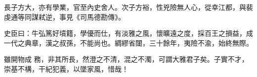 \begin{pinyinscope}
 長子方大，亦有學業，官至內史舍人。次子方裕，性兇險無人心，從幸江都，與裴虔通等同謀弒逆，事見《司馬德勘傳》。



 史臣曰：牛弘篤好墳籍，學優而仕，有淡雅之風，懷曠遠之度，採百王之損益，成一代之典章，漢之叔孫，不能尚也。綢繆省闥，三十餘年，夷險不渝，始終無際。



 雖開物成
 務，非其所長，然澄之不清，混之不濁，可謂大雅君子矣。子實不才，崇基不構，干紀犯義，以墜家風，惜哉！



\end{pinyinscope}